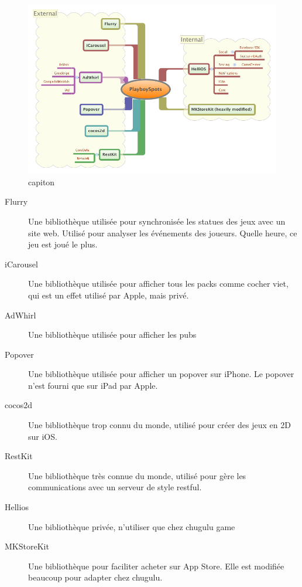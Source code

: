 \begin{figure}[htbp]
	\centering
		\includegraphics[width=7in]{XMinds/PlayboySpotsAppExternals.png}
	\caption{capiton}
	\label{fig:XMinds_PlayboySpotsAppExternals}
\end{figure}

\begin{description}
	\item[Flurry] Une bibliothèque utilisée pour synchronisée les statues des jeux avec un site web. Utilisé pour analyser les événements des joueurs. Quelle heure, ce jeu est joué le plus.
	\item[iCarousel] Une bibliothèque utilisée pour afficher tous les packs comme cocher viet, qui est un effet utilisé par Apple, mais privé.
	\item[AdWhirl] Une bibliothèque utilisée pour afficher les pubs
	\item[Popover] Une bibliothèque utilisée pour afficher un popover sur iPhone. Le popover n'est fourni que sur iPad par Apple.
	\item[cocos2d] Une bibliothèque trop connu du monde, utilisé pour créer des jeux en 2D sur iOS.
	\item[RestKit] Une bibliothèque très connue du monde, utilisé pour gère les communications avec un serveur de style restful.
	\item[Hellios] Une bibliothèque privée, n'utiliser que chez chugulu game
	\item[MKStoreKit] Une bibliothèque pour faciliter acheter sur App Store. Elle est modifiée beaucoup pour adapter chez chugulu.
\end{description}




